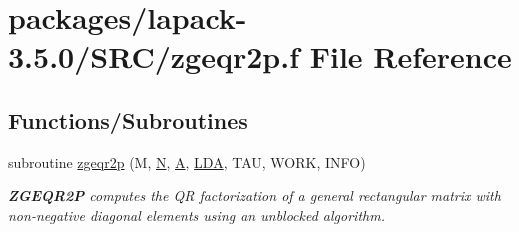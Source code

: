 \hypertarget{zgeqr2p_8f}{}\section{packages/lapack-\/3.5.0/\+S\+R\+C/zgeqr2p.f File Reference}
\label{zgeqr2p_8f}
\subsection*{Functions/\+Subroutines}
\begin{DoxyCompactItemize}
\item 
subroutine \hyperlink{group__complex16GEcomputational_gaa30b8f4dd026d7cfe34229378f5f331d}{zgeqr2p} (M, \hyperlink{polmisc_8c_a0240ac851181b84ac374872dc5434ee4}{N}, \hyperlink{classA}{A}, \hyperlink{example__user_8c_ae946da542ce0db94dced19b2ecefd1aa}{L\+D\+A}, T\+A\+U, W\+O\+R\+K, I\+N\+F\+O)
\begin{DoxyCompactList}\small\item\em {\bfseries Z\+G\+E\+Q\+R2\+P} computes the Q\+R factorization of a general rectangular matrix with non-\/negative diagonal elements using an unblocked algorithm. \end{DoxyCompactList}\end{DoxyCompactItemize}
